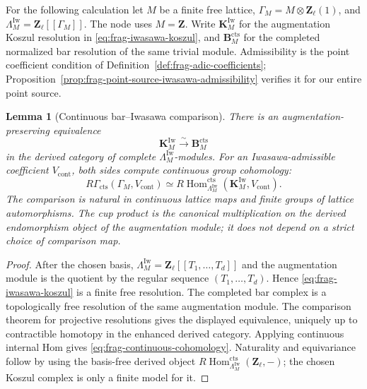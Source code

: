 \documentclass[11pt]{article}
\newtheorem{lemma}[theorem]{Lemma}
\theoremstyle{definition}
\theoremstyle{remark}
\begin{document}
For the following calculation let $M$ be a finite free lattice,
$\Gamma_M=M\otimes\mathbf Z_\ell(1)$, and
$\Lambda_M^{\mathrm{Iw}}=\mathbf Z_\ell[[\Gamma_M]]$.
The node uses $M=\mathbf Z$.  Write $\mathbf K_M^{\mathrm{Iw}}$ for
the augmentation Koszul resolution in
\eqref{eq:frag-iwasawa-koszul}, and $\mathbf B_M^{\mathrm{cts}}$ for
the completed normalized bar resolution of the same trivial module.
Admissibility is the point coefficient condition of
Definition~\ref{def:frag-adic-coefficients};
Proposition~\ref{prop:frag-point-source-iwasawa-admissibility}
verifies it for our entire point source.

\begin{lemma}[Continuous bar--Iwasawa comparison]
\label{lem:frag-continuous-bar-iwasawa}
There is an augmentation-preserving equivalence
\[
 \mathbf K_M^{\mathrm{Iw}}\xrightarrow{\sim}\mathbf B_M^{\mathrm{cts}}
\]
in the derived category of complete $\Lambda_M^{\mathrm{Iw}}$-modules.  For an
Iwasawa-admissible coefficient $V_{\mathrm{cont}}$, both sides compute
continuous group cohomology:
\begin{equation}
 R\Gamma_{\mathrm{cts}}(\Gamma_M,V_{\mathrm{cont}})
 \simeq
 R\!\operatorname{Hom}^{\mathrm{cts}}_{\Lambda_M^{\mathrm{Iw}}}
      (\mathbf K_M^{\mathrm{Iw}},V_{\mathrm{cont}}).
 \label{eq:frag-continuous-cohomology}
\end{equation}
The comparison is natural in continuous lattice maps and finite groups of
lattice automorphisms.  The cup product is the canonical multiplication on the
derived endomorphism object of the augmentation module; it does not depend on
a strict choice of comparison map.
\end{lemma}

\begin{proof}
After the chosen basis,
$\Lambda_M^{\mathrm{Iw}}=\mathbf Z_\ell[[T_1,\ldots,T_d]]$ and the augmentation
module is the quotient by the regular sequence $(T_1,\ldots,T_d)$.  Hence
\eqref{eq:frag-iwasawa-koszul} is a finite free resolution.  The completed bar
complex is a topologically free resolution of the same augmentation module.
The comparison theorem for projective resolutions gives the displayed
equivalence, uniquely up to contractible homotopy in the enhanced derived
category.  Applying continuous internal Hom gives
\eqref{eq:frag-continuous-cohomology}.  Naturality and equivariance follow by
using the basis-free derived object
$R\!\operatorname{Hom}^{\mathrm{cts}}_{\Lambda_M^{\mathrm{Iw}}}
(\mathbf Z_\ell,-)$; the chosen Koszul complex is only a finite model for it.
\end{proof}
\end{document}
